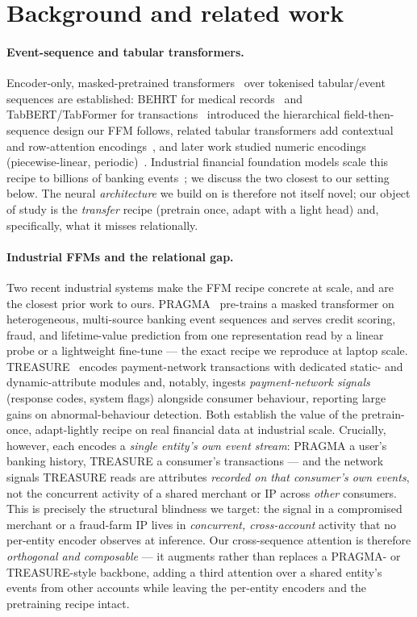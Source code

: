 \section{Background and related work}

\paragraph{Event-sequence and tabular transformers.} Encoder-only, masked-pretrained
transformers~\cite{vaswani2017attention,devlin2019bert} over tokenised tabular/event sequences
are established: BEHRT for medical records~\cite{li2020behrt} and
TabBERT/TabFormer for transactions~\cite{padhi2021tabular} introduced the hierarchical
field-then-sequence design our FFM follows, related tabular transformers add contextual and
row-attention encodings~\cite{huang2020tabtransformer,somepalli2021saint}, and later work
studied numeric encodings (piecewise-linear, periodic)~\cite{gorishniy2022embeddings}.
Industrial financial foundation models scale this recipe to billions of banking
events~\cite{braithwaite2025spending}; we discuss the two closest to our setting below. The neural
\emph{architecture} we build on is therefore not itself novel; our object of study is the
\emph{transfer} recipe (pretrain once, adapt with a light head) and, specifically, what it misses
relationally.

\paragraph{Industrial FFMs and the relational gap.} Two recent industrial systems make the FFM
recipe concrete at scale, and are the closest prior work to ours. PRAGMA~\cite{ostroukhov2026pragma}
pre-trains a masked transformer on heterogeneous, multi-source banking event sequences and serves
credit scoring, fraud, and lifetime-value prediction from one representation read by a linear probe
or a lightweight fine-tune --- the exact recipe we reproduce at laptop scale. TREASURE~\cite{yeh2025treasure}
encodes payment-network transactions with dedicated static- and dynamic-attribute modules and,
notably, ingests \emph{payment-network signals} (response codes, system flags) alongside consumer
behaviour, reporting large gains on abnormal-behaviour detection. Both establish the value of the
pretrain-once, adapt-lightly recipe on real financial data at industrial scale. Crucially, however,
each encodes a \emph{single entity's own event stream}: PRAGMA a user's banking history, TREASURE a
consumer's transactions --- and the network signals TREASURE reads are attributes \emph{recorded on
that consumer's own events}, not the concurrent activity of a shared merchant or IP across
\emph{other} consumers. This is precisely the structural blindness we target: the signal in a
compromised merchant or a fraud-farm IP lives in \emph{concurrent, cross-account} activity that no
per-entity encoder observes at inference. Our cross-sequence attention is therefore
\emph{orthogonal and composable} --- it augments rather than replaces a PRAGMA- or TREASURE-style
backbone, adding a third attention over a shared entity's events from other accounts while leaving
the per-entity encoders and the pretraining recipe intact.

